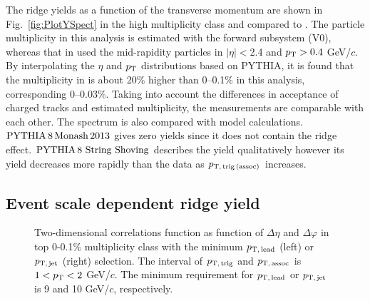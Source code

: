 The ridge yields as a function of  the transverse momentum are shown in Fig.~\ref{fig:PlotYSpect} in the high multiplicity class and compared to \cite{Khachatryan:2015lva}. The particle multiplicity in this analysis is estimated with the forward subsystem (V0), whereas that in \cite{Khachatryan:2015lva}  used the mid-rapidity particles in $|\eta|<$2.4 and $p_\mathrm{T}>0.4$ GeV/$c$. By interpolating the $\eta$ and $p_\mathrm{T}{}$ distributions based on PYTHIA, it is found that the multiplicity in \cite{Khachatryan:2015lva} is about 20\% higher than 0--0.1\% in this analysis, corresponding 0--0.03\%. Taking into account the differences in acceptance of charged tracks and estimated multiplicity, the measurements are comparable with each other. The spectrum is also compared with model calculations. $\mathrm{PYTHIA}\,8\,\mathrm{Monash}\,2013$ gives zero yields since it does not contain the ridge effect. $\mathrm{PYTHIA}\,8~\mathrm{String}~\mathrm{Shoving}$ describes the yield qualitatively however its yield decreases more rapidly than the data as $p_\mathrm{T,\,trig\,(assoc)}$ increases.

\subsection{Event scale dependent ridge yield}
\begin{figure}[h!]
	\centering
	\caption{ Two-dimensional correlations function as function of $\Delta\eta$ and $\Delta\varphi$ in top 0-0.1\% multiplicity class with the minimum $p_\mathrm{T,\,lead}$ (left) or $p_\mathrm{T,\,jet}$ (right) selection. The interval of $p_\mathrm{T,\,trig}$ and $p_\mathrm{T,\,assoc}$ is $1<p_\mathrm{T}<2$ GeV/$c$. The minimum requirement for $p_\mathrm{T,\,lead}$ or $p_\mathrm{T,\,jet}$ is 9 and 10 GeV/$c$, respectively. }
	\label{fig:PlotCorrHMTSel}
\end{figure}

